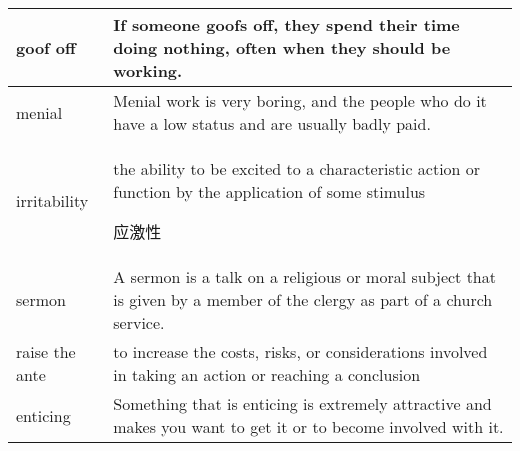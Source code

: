 \documentclass{article}
\begin{document}
\begin{center}
\begin{longtable}{|l|p{9cm}|}
\hline
goof off
&
If someone goofs off, they spend their time doing nothing, often when they should be working.
\\

\hline
menial
&
Menial work is very boring, and the people who do it have a low status and are usually badly paid.
\\

\hline
irritability
&
the ability to be excited to a characteristic action or function by the application of some stimulus
\par
应激性
\\

\hline
sermon
&
A sermon is a talk on a religious or moral subject that is given by a member of the clergy as part of a church service.
\\


\hline
raise the ante
&
to increase the costs, risks, or considerations involved in taking an action or reaching a conclusion
\\

\hline
enticing
&
Something that is enticing is extremely attractive and makes you want to get it or to become involved with it.
\\

\end{longtable}
\end{center}
\end{document}
